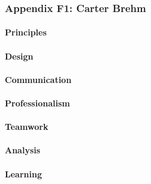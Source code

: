 \documentclass[../../main.tex]{subfiles}
\begin{document}
\subsubsection{Appendix F1: Carter Brehm}

\paragraph{Principles}


\paragraph{Design}


\paragraph{Communication}


\paragraph{Professionalism}


\paragraph{Teamwork}


\paragraph{Analysis}


\paragraph{Learning}
\end{document}
